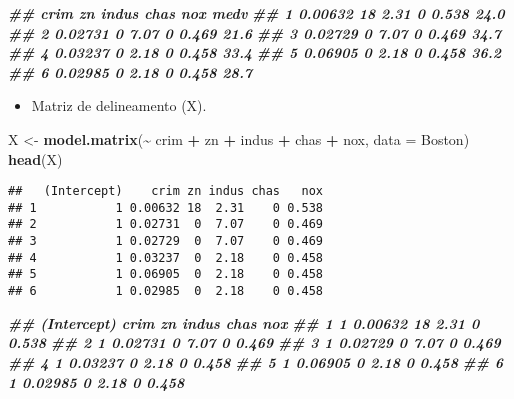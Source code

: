 \documentclass[
]{article}
\newenvironment{Shaded}{\begin{snugshade}}{\end{snugshade}}
\newcommand{\AttributeTok}[1]{\textcolor[rgb]{0.13,0.29,0.53}{#1}}
\newcommand{\DocumentationTok}[1]{\textcolor[rgb]{0.56,0.35,0.01}{\textbf{\textit{#1}}}}
\newcommand{\FunctionTok}[1]{\textcolor[rgb]{0.13,0.29,0.53}{\textbf{#1}}}
\newcommand{\NormalTok}[1]{#1}
\newcommand{\OtherTok}[1]{\textcolor[rgb]{0.56,0.35,0.01}{#1}}
\newcommand{\SpecialCharTok}[1]{\textcolor[rgb]{0.81,0.36,0.00}{\textbf{#1}}}
\providecommand{\tightlist}{%
  \setlength{\itemsep}{0pt}\setlength{\parskip}{0pt}}
\begin{document}
\begin{Shaded}
\begin{Highlighting}[]
\DocumentationTok{\#\# crim zn indus chas nox medv}
\DocumentationTok{\#\# 1 0.00632 18 2.31 0 0.538 24.0}
\DocumentationTok{\#\# 2 0.02731 0 7.07 0 0.469 21.6}
\DocumentationTok{\#\# 3 0.02729 0 7.07 0 0.469 34.7}
\DocumentationTok{\#\# 4 0.03237 0 2.18 0 0.458 33.4}
\DocumentationTok{\#\# 5 0.06905 0 2.18 0 0.458 36.2}
\DocumentationTok{\#\# 6 0.02985 0 2.18 0 0.458 28.7}
\end{Highlighting}
\end{Shaded}

\begin{itemize}
\tightlist
\item
  Matriz de delineamento (X).
\end{itemize}

\begin{Shaded}
\begin{Highlighting}[]
\NormalTok{X }\OtherTok{\textless{}{-}} \FunctionTok{model.matrix}\NormalTok{(}\SpecialCharTok{\textasciitilde{}}\NormalTok{ crim }\SpecialCharTok{+}\NormalTok{ zn }\SpecialCharTok{+}\NormalTok{ indus }\SpecialCharTok{+}
\NormalTok{chas }\SpecialCharTok{+}\NormalTok{ nox, }\AttributeTok{data =}\NormalTok{ Boston)}
\FunctionTok{head}\NormalTok{(X)}
\end{Highlighting}
\end{Shaded}

\begin{verbatim}
##   (Intercept)    crim zn indus chas   nox
## 1           1 0.00632 18  2.31    0 0.538
## 2           1 0.02731  0  7.07    0 0.469
## 3           1 0.02729  0  7.07    0 0.469
## 4           1 0.03237  0  2.18    0 0.458
## 5           1 0.06905  0  2.18    0 0.458
## 6           1 0.02985  0  2.18    0 0.458
\end{verbatim}

\begin{Shaded}
\begin{Highlighting}[]
\DocumentationTok{\#\# (Intercept) crim zn indus chas nox}
\DocumentationTok{\#\# 1 1 0.00632 18 2.31 0 0.538}
\DocumentationTok{\#\# 2 1 0.02731 0 7.07 0 0.469}
\DocumentationTok{\#\# 3 1 0.02729 0 7.07 0 0.469}
\DocumentationTok{\#\# 4 1 0.03237 0 2.18 0 0.458}
\DocumentationTok{\#\# 5 1 0.06905 0 2.18 0 0.458}
\DocumentationTok{\#\# 6 1 0.02985 0 2.18 0 0.458}
\end{Highlighting}
\end{Shaded}
\end{document}
